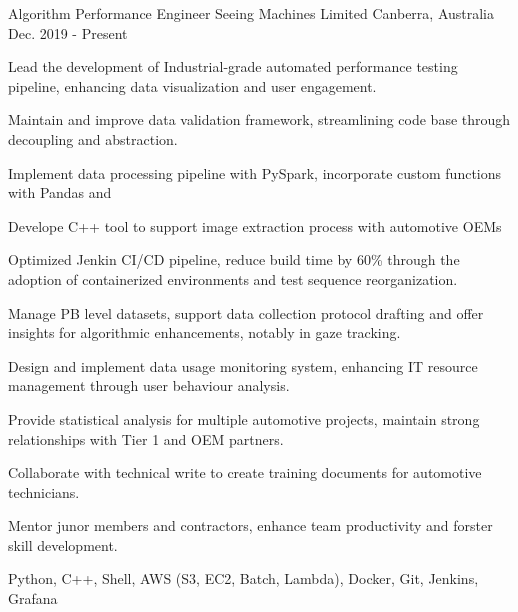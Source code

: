 

\begin{cventries}

  \cventry
    {Algorithm Performance Engineer} %
    {Seeing Machines Limited} %
    {Canberra, Australia} %
    {Dec. 2019 - Present} %
    {
      \begin{cvitems} %
        \item {Lead the development of Industrial-grade automated performance testing pipeline, enhancing data visualization and user engagement.}
        \item {Maintain and improve data validation framework, streamlining code base through decoupling and abstraction.}
        \item {Implement data processing pipeline with PySpark, incorporate custom functions with Pandas and }
        \item {Develope C++ tool to support image extraction process with automotive OEMs}
        \item {Optimized Jenkin CI/CD pipeline, reduce build time by 60\% through the adoption of containerized environments and test sequence reorganization.}
        \item {Manage PB level datasets, support data collection protocol drafting and offer insights for algorithmic enhancements, notably in gaze tracking.}
        \item {Design and implement data usage monitoring system, enhancing IT resource management through user behaviour analysis.}
        \item {Provide statistical analysis for multiple automotive projects, maintain strong relationships with Tier 1 and OEM partners.}
        \item {Collaborate with technical write to create training documents for automotive technicians.}
        \item {Mentor junor members and contractors, enhance team productivity and forster skill development.}
        \item {Python, C++, Shell, AWS (S3, EC2, Batch, Lambda), Docker, Git, Jenkins, Grafana}
      \end{cvitems}
    }


\end{cventries}
